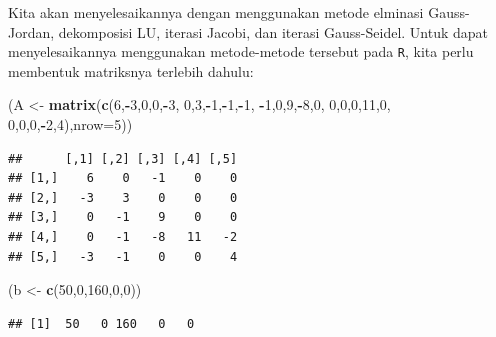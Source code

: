 \documentclass[
]{book}
\newenvironment{Shaded}{\begin{snugshade}}{\end{snugshade}}
\newcommand{\AttributeTok}[1]{\textcolor[rgb]{0.13,0.29,0.53}{#1}}
\newcommand{\DecValTok}[1]{\textcolor[rgb]{0.00,0.00,0.81}{#1}}
\newcommand{\FunctionTok}[1]{\textcolor[rgb]{0.13,0.29,0.53}{\textbf{#1}}}
\newcommand{\NormalTok}[1]{#1}
\newcommand{\OtherTok}[1]{\textcolor[rgb]{0.56,0.35,0.01}{#1}}
\newcommand{\SpecialCharTok}[1]{\textcolor[rgb]{0.81,0.36,0.00}{\textbf{#1}}}
\theoremstyle{definition}
\theoremstyle{definition}
\theoremstyle{definition}
\theoremstyle{definition}
\theoremstyle{remark}
\begin{document}
Kita akan menyelesaikannya dengan menggunakan metode elminasi Gauss-Jordan, dekomposisi LU, iterasi Jacobi, dan iterasi Gauss-Seidel. Untuk dapat menyelesaikannya menggunakan metode-metode tersebut pada \texttt{R}, kita perlu membentuk matriksnya terlebih dahulu:

\begin{Shaded}
\begin{Highlighting}[]
\NormalTok{(A }\OtherTok{\textless{}{-}} \FunctionTok{matrix}\NormalTok{(}\FunctionTok{c}\NormalTok{(}\DecValTok{6}\NormalTok{,}\SpecialCharTok{{-}}\DecValTok{3}\NormalTok{,}\DecValTok{0}\NormalTok{,}\DecValTok{0}\NormalTok{,}\SpecialCharTok{{-}}\DecValTok{3}\NormalTok{,}
              \DecValTok{0}\NormalTok{,}\DecValTok{3}\NormalTok{,}\SpecialCharTok{{-}}\DecValTok{1}\NormalTok{,}\SpecialCharTok{{-}}\DecValTok{1}\NormalTok{,}\SpecialCharTok{{-}}\DecValTok{1}\NormalTok{,}
              \SpecialCharTok{{-}}\DecValTok{1}\NormalTok{,}\DecValTok{0}\NormalTok{,}\DecValTok{9}\NormalTok{,}\SpecialCharTok{{-}}\DecValTok{8}\NormalTok{,}\DecValTok{0}\NormalTok{,}
              \DecValTok{0}\NormalTok{,}\DecValTok{0}\NormalTok{,}\DecValTok{0}\NormalTok{,}\DecValTok{11}\NormalTok{,}\DecValTok{0}\NormalTok{,}
              \DecValTok{0}\NormalTok{,}\DecValTok{0}\NormalTok{,}\DecValTok{0}\NormalTok{,}\SpecialCharTok{{-}}\DecValTok{2}\NormalTok{,}\DecValTok{4}\NormalTok{),}\AttributeTok{nrow=}\DecValTok{5}\NormalTok{))}
\end{Highlighting}
\end{Shaded}

\begin{verbatim}
##      [,1] [,2] [,3] [,4] [,5]
## [1,]    6    0   -1    0    0
## [2,]   -3    3    0    0    0
## [3,]    0   -1    9    0    0
## [4,]    0   -1   -8   11   -2
## [5,]   -3   -1    0    0    4
\end{verbatim}

\begin{Shaded}
\begin{Highlighting}[]
\NormalTok{(b }\OtherTok{\textless{}{-}} \FunctionTok{c}\NormalTok{(}\DecValTok{50}\NormalTok{,}\DecValTok{0}\NormalTok{,}\DecValTok{160}\NormalTok{,}\DecValTok{0}\NormalTok{,}\DecValTok{0}\NormalTok{))}
\end{Highlighting}
\end{Shaded}

\begin{verbatim}
## [1]  50   0 160   0   0
\end{verbatim}
\end{document}
